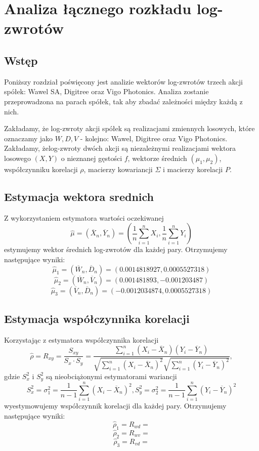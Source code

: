 \documentclass[a4paper,11pt]{article}
\begin{document}
\newpage\section{Analiza łącznego rozkładu log-zwrotów}

\subsection{Wstęp}
Poniższy rozdział poświęcony jest analizie wektorów log-zwrotów trzech akcji spółek: Wawel SA, Digitree oraz Vigo Photonics. Analiza zostanie przeprowadzona na parach spółek, tak aby zbadać zależności między każdą z nich.

Zakładamy, że log-zwroty akcji spółek są realizacjami zmiennych losowych, które oznaczamy jako $W, D, V$ - kolejno: Wawel, Digitree oraz Vigo Photonics. Zakładamy, żelog-zwroty dwóch akcji są niezależnymi realizacjami wektora losowego $(X,Y)$ o nieznanej gęstości $f$, wektorze średnich $(\mu_1,\mu_2)$, współczynniku korelacji $\rho$, macierzy kowariancji $\Sigma$ i macierzy korelacji $P$.

\subsection{Estymacja wektora srednich}
Z wykorzystaniem estymatora wartości oczekiwanej
$$\hat{\mu}=(\overline{X}_n, \overline{Y}_n) = (\frac{1}{n}\sum_{i=1}^{n}X_i, \frac{1}{n}\sum_{i=1}^{n}Y_i)$$
estymujemy wektor średnich log-zwrotów dla każdej pary. Otrzymujemy następujące wyniki:
$$\hat{\mu}_1=(\overline{W}_n, \overline{D}_n) = (0.0014818927, 0.0005527318)$$
$$\hat{\mu}_2=(\overline{W}_n, \overline{V}_n) = (0.001481893, -0.001203487)$$
$$\hat{\mu}_3=(\overline{V}_n, \overline{D}_n) = (-0.0012034874, 0.0005527318)$$

\subsection{Estymacja współczynnika korelacji}
Korzystając z estymatora współczynnika korelacji
$$\hat{\rho}=R_{xy}=\frac{S_{xy}}{S_x\cdot S_y}=\frac{\sum_{i=1}^{n}(X_i-\overline{X}_n)(Y_i-\overline{Y}_n)}{\sqrt{\sum_{i=1}^{n}(X_i-\overline{X}_n)^{2}}\sqrt{\sum_{i=1}^{n}(Y_i-\overline{Y}_n)^{2}}},$$
gdzie $S_x^{2}$ i $S_y^{2}$ są nieobciążonymi estymatorami wariancji
$$S^2_x=\sigma_1^2=\frac{1}{n-1}\sum_{i=1}^{n}(X_i-\overline{X}_n)^2, S^2_y=\sigma_2^2=\frac{1}{n-1}\sum_{i=1}^{n}(Y_i-\overline{Y}_n)^2$$ 
wyestymowujemy współczynnik korelacji dla każdej pary. Otrzymujemy następujące wyniki:
$$\hat{\rho}_1=R_{wd}=$$
$$\hat{\rho}_2=R_{wv}=$$
$$\hat{\rho}_3=R_{vd}=$$
\end{document}

